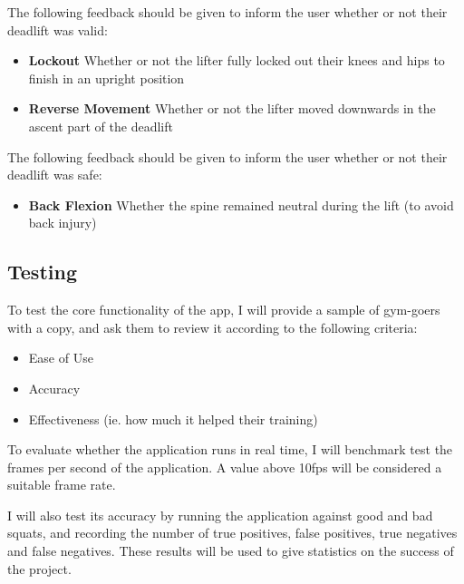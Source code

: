 The following feedback should be given to inform the user whether or not their deadlift was valid:

\begin{itemize}
	\item \textbf{Lockout} Whether or not the lifter fully locked out their knees and hips to finish in an upright position
	\item \textbf{Reverse Movement} Whether or not the lifter moved downwards in the ascent part of the deadlift
\end{itemize}

The following feedback should be given to inform the user whether or not their deadlift was safe:

\begin{itemize}
	\item \textbf{Back Flexion} Whether the spine remained neutral during the lift (to avoid back injury)
\end{itemize}

\subsection{Testing}

To test the core functionality of the app, I will provide a sample of gym-goers with a copy, and ask them to review it according to the following criteria:

\begin{itemize}
	\item Ease of Use
	\item Accuracy
	\item Effectiveness (ie. how much it helped their training)
\end{itemize}

To evaluate whether the application runs in real time, I will benchmark test the frames per second of the application. A value above 10fps will be considered a suitable frame rate.

I will also test its accuracy by running the application against good and bad squats, and recording the number of true positives, false positives, true negatives and false negatives. These results will be used to give statistics on the success of the project.